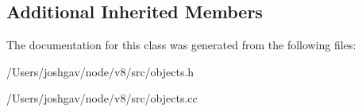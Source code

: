 \subsection*{Additional Inherited Members}


The documentation for this class was generated from the following files\+:\begin{DoxyCompactItemize}
\item 
/\+Users/joshgav/node/v8/src/objects.\+h\item 
/\+Users/joshgav/node/v8/src/objects.\+cc\end{DoxyCompactItemize}
